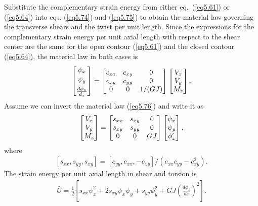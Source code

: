 \documentclass{AeroStructure-ERJohnson}
\begin{document}
Substitute the complementary strain energy from either eq.~(\ref{eq5.61}) or (\ref{eq5.64}) into eqs. (\ref{eq5.74}) and (\ref{eq5.75}) to obtain the material law governing the transverse shears and the twist per unit length. Since the expressions for the complementary strain energy per unit axial length with respect to the shear center are the same for the open contour (\ref{eq5.61}) and the closed contour (\ref{eq5.64}), the material law in both cases is
\begin{align}\label{eq5.76}
\left[\begin{array}{@{}c@{}}\psi_{x} \\[2pt] \psi_{y} \\[4pt] \frac{d \phi_{z}}{d_{z}}\end{array}\right]=\left[\begin{array}{@{}ccc@{}}c_{x x} & c_{x y} & 0 \\c_{x y} & c_{y y} & 0 \\0 & 0 & 1 /(G J)\end{array}\right]\left[\begin{array}{@{}c@{}}V_{x} \\V_{y} \\M_{z}\end{array}\right].
\end{align}
Assume we can invert the material law (\ref{eq5.76}) and write it as
\begin{align}\label{eq5.77}
\left[\begin{array}{@{}c@{}}V_{x} \\V_{y} \\M_{z}\end{array}\right]=\left[\begin{array}{@{}ccc@{}}s_{x x} & s_{x y} & 0 \\s_{x y} & s_{y y} & 0 \\0 & 0 & G J\end{array}\right]\left[\begin{array}{@{}c@{}}\psi_{x} \\\psi_{y} \\\phi_{z}^{\prime}\end{array}\right],
\end{align}
where
\begin{align}\label{eq5.78}
\left[s_{x x}, s_{y y}, s_{x y}\right]=\left[c_{y y}, c_{x x},-c_{x y}\right] /\left(c_{x x} c_{y y}-c_{x y}^{2}\right).
\end{align}
The strain energy per unit axial length in shear and torsion is
\begin{align}\label{eq5.79}
\bar{U}=\frac{1}{2}\left[s_{x x} \psi_{x}^{2}+2 s_{x y} \psi_{x} \psi_{y}+s_{y y} \psi_{y}^{2}+G J\left(\frac{d \phi_{z}}{d z}\right)^{2}\right].
\end{align}
\end{document}
